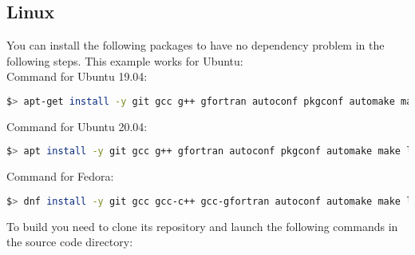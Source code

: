 \documentclass[a4paper, 12pt]{report}
\begin{document}
\subsection{Linux}

You can install the following packages to have no dependency problem in the following steps. This example works for Ubuntu: \\

Command for Ubuntu 19.04:

\begin{lstlisting}[language=bash]
$> apt-get install -y git gcc g++ gfortran autoconf pkgconf automake make libtool cmake hwloc openjdk-8-jdk libblas-dev liblpsolve55-dev libarchive-dev doxygen doxygen-latex liblapack-dev libexpat1-dev libsqlite3-dev zlib1g-dev gettext patch clang python-pip libncurses5-dev libreadline-dev libdigest-perl-md5-perl unzip gcovr lcov libboost-all-dev qt4-qmake qt4-dev-tools lsb-release libxml2-utils python-lxml python-psutil wget libcurl4-openssl-dev rsync bash-completion
\end{lstlisting}

Command for Ubuntu 20.04:

\begin{lstlisting}[language=bash]
$> apt install -y git gcc g++ gfortran autoconf pkgconf automake make libtool cmake hwloc openjdk-8-jdk libblas-dev liblpsolve55-dev libarchive-dev doxygen doxygen-latex liblapack-dev libexpat1-dev libsqlite3-dev zlib1g-dev gettext patch clang python3-pip libncurses5-dev libreadline-dev libdigest-perl-md5-perl unzip gcovr lcov libboost-all-dev qt5-default lsb-release libxml2-utils python-lxml python-psutil wget libcurl4-openssl-dev rsync libopenblas-openmp-dev
\end{lstlisting}

Command for Fedora:

\begin{lstlisting}[language=bash]
$> dnf install -y git gcc gcc-c++ gcc-gfortran autoconf automake make libtool cmake hwloc java-1.8.0-openjdk-devel blas-devel lapack-devel lpsolve-devel expat-devel glibc-devel sqlite-devel libarchive-devel zlib-devel doxygen doxygen-latex qt-devel gettext patch wget python-devel clang llvm-devel ncurses-devel readline-devel unzip perl-Digest-MD5 vim gcovr python-pip python-psutil boost-devel lcov gtest-devel gmock-devel xz rsync python-lxml graphviz libcurl-devel bash-completion
\end{lstlisting}

To build \Dynawo you need to clone its repository and launch the following commands in the source code directory:
\end{document}
